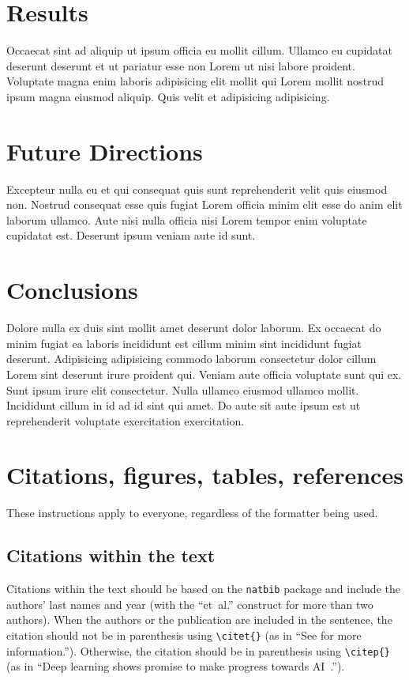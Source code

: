 \section{Results}

Occaecat sint ad aliquip ut ipsum officia eu mollit cillum. Ullamco eu cupidatat deserunt deserunt et ut pariatur esse non Lorem ut nisi labore proident. Voluptate magna enim laboris adipisicing elit mollit qui Lorem mollit nostrud ipsum magna eiusmod aliquip. Quis velit et adipisicing adipisicing.

\section{Future Directions}

Excepteur nulla eu et qui consequat quis sunt reprehenderit velit quis eiusmod non. Nostrud consequat esse quis fugiat Lorem officia minim elit esse do anim elit laborum ullamco. Aute nisi nulla officia nisi Lorem tempor enim voluptate cupidatat est. Deserunt ipsum veniam aute id sunt.

\section{Conclusions}

Dolore nulla ex duis sint mollit amet deserunt dolor laborum. Ex occaecat do minim fugiat ea laboris incididunt est cillum minim sint incididunt fugiat deserunt. Adipisicing adipisicing commodo laborum consectetur dolor cillum Lorem sint deserunt irure proident qui. Veniam aute officia voluptate sunt qui ex. Sunt ipsum irure elit consectetur. Nulla ullamco eiusmod ullamco mollit. Incididunt cillum in id ad id sint qui amet. Do aute sit aute ipsum est ut reprehenderit voluptate exercitation exercitation.

\section{Citations, figures, tables, references}
\label{others}

These instructions apply to everyone, regardless of the formatter being used.

\subsection{Citations within the text}

Citations within the text should be based on the \texttt{natbib} package
and include the authors' last names and year (with the ``et~al.'' construct
for more than two authors). When the authors or the publication are
included in the sentence, the citation should not be in parenthesis using \verb|\citet{}| (as
in ``See \citet{Hinton06} for more information.''). Otherwise, the citation
should be in parenthesis using \verb|\citep{}| (as in ``Deep learning shows promise to make progress
towards AI~\citep{Bengio+chapter2007}.'').

